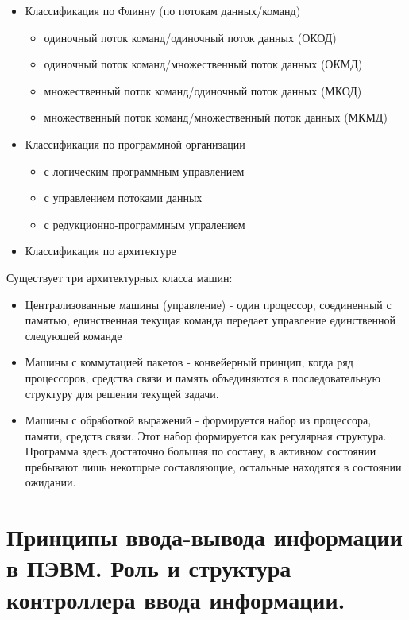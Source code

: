 \documentclass[unicode, 12pt, a4paper, oneside]{article}
\begin{document}
\begin{itemize}
\item Классификация по Флинну (по потокам данных/команд)
	\begin{itemize}
	\item одиночный поток команд/одиночный поток данных (ОКОД)
	\item одиночный поток команд/множественный поток данных (ОКМД)
	\item множественный поток команд/одиночный поток данных (МКОД)
	\item множественный поток команд/множественный поток данных (МКМД)
	\end{itemize}
\item Классификация по программной организации
		\begin{itemize}
		\item с логическим программным управлением
		\item с управлением потоками данных
		\item с редукционно-программным упралением
		\end{itemize}
\item Классификация по архитектуре
\end{itemize} 

Существует три архитектурных класса машин:

\begin{itemize}
\item Централизованные машины (управление) - один процессор, соединенный с памятью, единственная текущая команда передает управление единственной следующей команде
\item Машины с коммутацией пакетов - конвейерный принцип, когда ряд процессоров, средства связи и память объединяются в последовательную структуру для решения текущей задачи.
\item Машины с обработкой выражений - формируется набор из процессора, памяти, средств связи. Этот набор формируется как регулярная структура. Программа здесь достаточно большая по составу, в активном состоянии пребывают лишь некоторые составляющие, остальные находятся в состоянии ожидании.
\end{itemize}

\section{Принципы ввода-вывода информации в ПЭВМ. Роль и структура контроллера ввода информации.}
\end{document}
